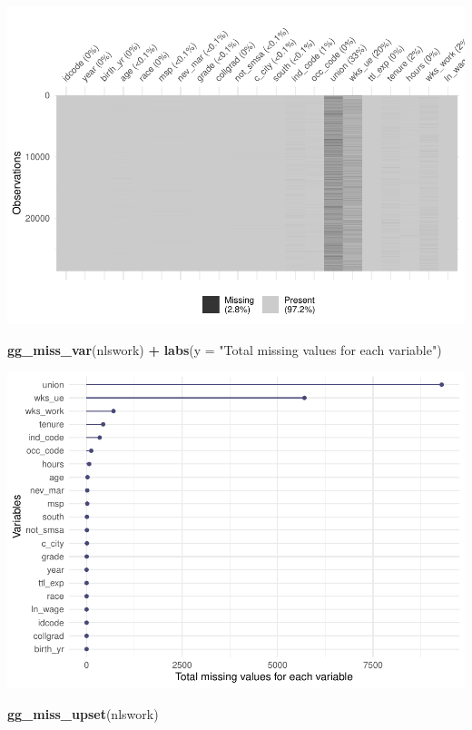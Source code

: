 \documentclass[
]{article}
\newenvironment{Shaded}{\begin{snugshade}}{\end{snugshade}}
\newcommand{\AttributeTok}[1]{\textcolor[rgb]{0.13,0.29,0.53}{#1}}
\newcommand{\FunctionTok}[1]{\textcolor[rgb]{0.13,0.29,0.53}{\textbf{#1}}}
\newcommand{\NormalTok}[1]{#1}
\newcommand{\SpecialCharTok}[1]{\textcolor[rgb]{0.81,0.36,0.00}{\textbf{#1}}}
\newcommand{\StringTok}[1]{\textcolor[rgb]{0.31,0.60,0.02}{#1}}
\begin{document}
\includegraphics{RIntro_files/figure-latex/unnamed-chunk-7-1.pdf}

\begin{Shaded}
\begin{Highlighting}[]
\FunctionTok{gg\_miss\_var}\NormalTok{(nlswork) }\SpecialCharTok{+} \FunctionTok{labs}\NormalTok{(}\AttributeTok{y =} \StringTok{"Total missing values for each variable"}\NormalTok{)}
\end{Highlighting}
\end{Shaded}

\includegraphics{RIntro_files/figure-latex/unnamed-chunk-8-1.pdf}

\begin{Shaded}
\begin{Highlighting}[]
\FunctionTok{gg\_miss\_upset}\NormalTok{(nlswork)}
\end{Highlighting}
\end{Shaded}
\end{document}
